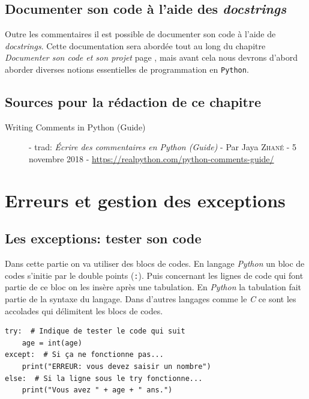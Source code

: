 \documentclass[a4paper,11pt]{book}
\begin{document}
\section{Documenter son code à l'aide des \textit{docstrings}}\label{documenteravecdocstring}
Outre les commentaires il est possible de documenter son code à l'aide de \textit{docstrings}. Cette documentation sera abordée tout au long du chapitre \textit{Documenter son code et son projet} page \pageref{documentercodeprojet}, mais avant cela nous devrons d'abord aborder diverses notions essentielles de programmation en \texttt{Python}.
\medskip
 
 \section*{Sources pour la rédaction de ce chapitre}
\begin{description}
	\item[Writing Comments in Python (Guide)] - trad: \og \textit{Écrire des commentaires en Python (Guide)} \fg{} - Par Jaya \textsc{Zhané} - 5 novembre 2018 - \url{https://realpython.com/python-comments-guide/}
\end{description}
\medskip

\chapter{Erreurs et gestion des exceptions}
\section{Les exceptions: tester son code}
Dans cette partie on va utiliser des blocs de codes. En langage \textit{Python} un bloc de codes s'initie par le double points (\texttt{:}). Puis concernant les lignes de code qui font partie de ce bloc on les insère après une tabulation. En \textit{Python} la tabulation fait partie de la syntaxe du langage. Dans d'autres langages comme le \textit{C} ce sont les accolades qui délimitent les blocs de codes.
\medskip

\begin{lstlisting}
try:  # Indique de tester le code qui suit
    age = int(age)
except:  # Si ça ne fonctionne pas...
    print("ERREUR: vous devez saisir un nombre")
else:  # Si la ligne sous le try fonctionne...
    print("Vous avez " + age + " ans.")
\end{lstlisting}
\medskip
\end{document}
